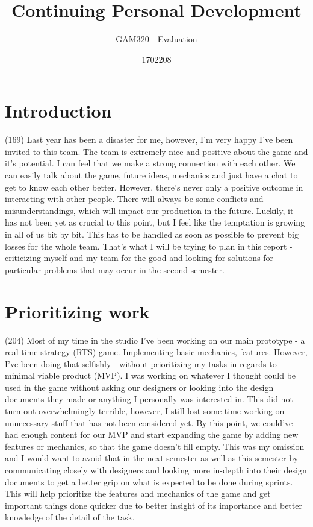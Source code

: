 \documentclass{scrartcl}
\title{Continuing Personal Development} %
\subtitle{GAM320 - Evaluation}
\author{1702208}
\begin{document}
\maketitle

\section{Introduction} (169)
Last year has been a disaster for me, however, I'm very happy I've been invited to this team. The team is extremely nice and positive about the game and it's potential. I can feel that we make a strong connection with each other. We can easily talk about the game, future ideas, mechanics and just have a chat to get to know each other better. However, there's never only a positive outcome in interacting with other people. There will always be some conflicts and misunderstandings, which will impact our production in the future. Luckily, it has not been yet as crucial to this point, but I feel like the temptation is growing in all of us bit by bit. This has to be handled as soon as possible to prevent big losses for the whole team. That's what I will be trying to plan in this report - criticizing myself and my team for the good and looking for solutions for particular problems that may occur in the second semester.

\section{Prioritizing work} (204)
Most of my time in the studio I've been working on our main prototype - a real-time strategy (RTS) game. Implementing basic mechanics, features. However, I've been doing that selfishly - without prioritizing my tasks in regards to minimal viable product (MVP). I was working on whatever I thought could be used in the game without asking our designers or looking into the design documents they made or anything I personally was interested in. This did not turn out overwhelmingly terrible, however, I still lost some time working on unnecessary stuff that has not been considered yet. By this point, we could've had enough content for our MVP and start expanding the game by adding new features or mechanics, so that the game doesn't fill empty. This was my omission and I would want to avoid that in the next semester as well as this semester by communicating closely with designers and looking more in-depth into their design documents to get a better grip on what is expected to be done during sprints. This will help prioritize the features and mechanics of the game and get important things done quicker due to better insight of its importance and better knowledge of the detail of the task.
\end{document}
